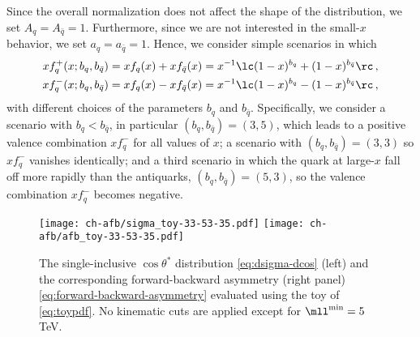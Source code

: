 Since the overall normalization does not affect the shape
of the distribution, we set $A_q=A_{\bar{q}}=1$.
%
Furthermore, since we are not interested in the small-$x$ behavior,
we set $a_q=a_{\bar{q}}=1$. 
%
Hence, we consider simple scenarios in which 
\begin{align}\label{eq:toyp}
xf_q^+(x; b_q,b_{\bar{q}}) &= xf_q(x)+xf_{\bar{q}}(x) = x^{-1}\lc (1-x)^{b_q} +(1-x)^{b_{\bar{q}}}  \rc  \,, \\\label{eq:toym}
xf_q^-(x; b_q,b_{\bar{q}}) &= xf_q(x)-xf_{\bar{q}}(x) = x^{-1}\lc (1-x)^{b_q} -(1-x)^{b_{\bar{q}}}  \rc  \,, 
\end{align}
with different choices of the parameters  $b_q$ and $b_{\bar{q}}$.
Specifically, we consider a scenario with $b_q < b_{\bar{q}} $, in particular
$(b_q,b_{\bar{q}})=(3,5)$, which leads to a positive valence combination $xf_q^-$
for all values of $x$;  a  scenario with
$(b_q,b_{\bar{q}})=(3,3)$ so  $xf_q^-$ vanishes identically; and a third scenario
in which the quark \pdfs at large-$x$ fall off more rapidly than the antiquarks,
$(b_q,b_{\bar{q}})=(5,3)$, so the valence combination $xf_q^-$ becomes negative.

\begin{figure}[!t]
 \centering
 \texttt{[image: ch-afb/sigma\_toy-33-53-35.pdf]}
 \texttt{[image: ch-afb/afb\_toy-33-53-35.pdf]}
 \caption{The single-inclusive $\cos\theta^*$ distribution
   \cref{eq:dsigma-dcos}  (left)
   and the corresponding forward-backward asymmetry
   (right panel) \cref{eq:forward-backward-asymmetry} evaluated using 
    the toy \pdfs of \cref{eq:toypdf}.
   No  kinematic cuts are applied except for $\mll^{\rm min}=5$ TeV.
 }    
 \label{fig:sigma_toy}
\end{figure}


